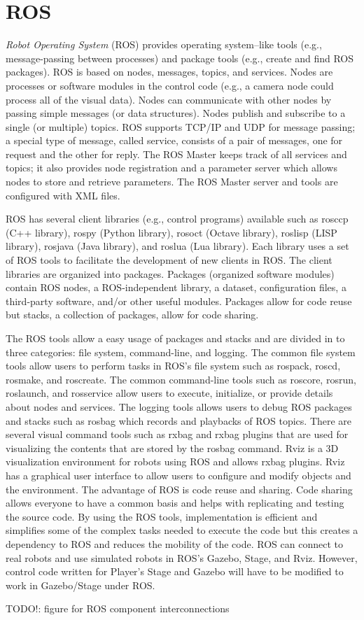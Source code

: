 \section{ROS}
\emph{Robot Operating System} (ROS) provides operating system--like tools (e.g., message-passing between processes) and package tools (e.g., create and find ROS packages). ROS is based on nodes, messages, topics, and services. Nodes are processes or software modules in the control code (e.g., a camera node could process all of the visual data). Nodes can communicate with other nodes by passing simple messages (or data structures). Nodes publish and subscribe to a single (or multiple) topics. ROS supports TCP/IP and UDP for message passing; a special type of message, called service, consists of a pair of messages, one for request and the other for reply.
 The ROS Master keeps track of all services and topics; it also provides node registration and a parameter server which allows nodes to store and retrieve parameters. The ROS Master server and tools are configured with XML files.


ROS has several client libraries (e.g., control programs) available such as rosccp (C++ library), rospy (Python library), rosoct (Octave library), roslisp (LISP library), rosjava (Java library), and roslua (Lua library). Each library uses a set of ROS tools to facilitate the development of new clients in ROS. The client libraries are organized into packages. Packages (organized software modules) contain ROS nodes, a ROS-independent library, a dataset, configuration files, a third-party software, and/or other useful modules.
Packages allow for code reuse but stacks, a collection of packages, allow for code sharing.


The ROS tools allow a easy usage of packages and stacks and are divided in to three categories: file system, command-line, and logging.
The common file system tools allow users to perform tasks in ROS’s file system such as rospack, roscd, rosmake, and roscreate. The common command-line tools such as roscore, rosrun, roslaunch, and rosservice allow users to execute, initialize, or provide details about nodes and services. The logging tools allows users to debug ROS packages and stacks such as rosbag which records and playbacks of ROS topics. There are several visual command tools such as rxbag and rxbag plugins that are used for visualizing the contents that are stored by the rosbag command. Rviz is a 3D visualization environment for robots using ROS and allows rxbag plugins. Rviz has a graphical user interface to allow users to configure and modify objects and the environment.
The advantage of ROS is code reuse and sharing. Code sharing allows everyone to have a common basis and helps with replicating and testing the source code. By using the ROS tools, implementation is efficient and simplifies some of the complex tasks needed to execute the code but this creates a dependency to ROS and reduces the mobility of the code. ROS can connect to real robots and use simulated robots in ROS’s Gazebo, Stage, and Rviz. However, control code written for Player’s Stage and Gazebo will have to be modified to work in Gazebo/Stage under ROS.


TODO!: figure for ROS component interconnections
